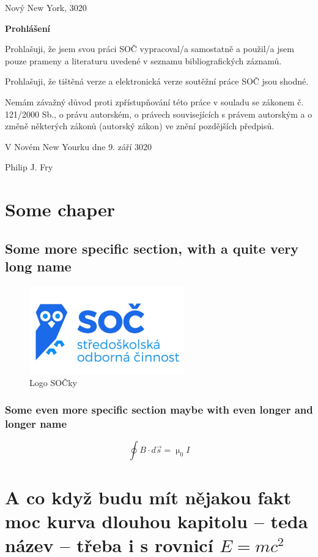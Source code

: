 \documentclass[12pt, a4paper,s
 twoside,        %
 openright
]{report}
\begin{document}
\noindent Nový New York, 3020

\cleardoublepage

{\Large{\bfseries{Prohlášení}}} %

\noindent Prohlašuji, že jsem svou práci SOČ vypracoval/a samostatně a použil/a jsem pouze prameny a literaturu uvedené v seznamu bibliografických záznamů.

\noindent Prohlašuji, že tištěná verze a elektronická verze soutěžní práce SOČ jsou shodné. 

\noindent Nemám závažný důvod proti zpřístupňování této práce v souladu se zákonem č. 121/2000 Sb., o právu autorském, o právech souvisejících s právem autorským a o změně některých zákonů (autorský zákon) ve znění pozdějších předpisů. 

\vspace{24 pt}

\noindent V Novém New Yourku dne 9. září 3020 \dotfill{} 

\hspace{8cm} Philip J. Fry


\tableofcontents

\chapter{Some chaper}
\lipsum[1-2]

\section[Třeba taky udělám zkratku]{Some more specific section, with a quite very long name}
\lipsum[1-2]

\begin{figure}[h]
    \centering
    \includegraphics[width=0.6\textwidth]{imgs/soc-logo.jpg}
    \caption{Logo SOČky}
    \label{fig:logoSOC}
\end{figure}

\subsection{Some even more specific section maybe with even longer and longer name}
\lipsum[1-2]
\begin{equation}
    \oint B \cdot d \vec{s} = \upmu_0 I
\end{equation}
\lipsum[1-3]

\chapter[Třeba to ale nějak zkrátím]{A co když budu mít nějakou fakt moc kurva dlouhou kapitolu -- teda název -- třeba i s rovnicí $E = mc^2$}
\end{document}
